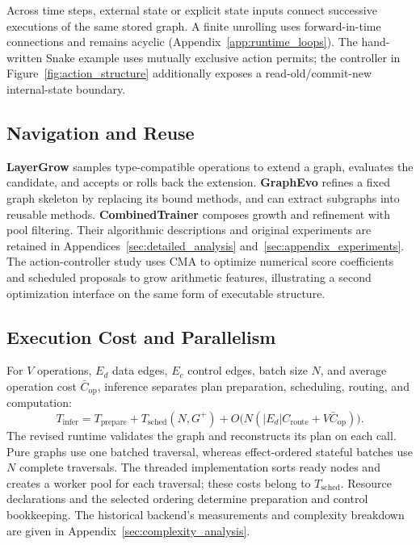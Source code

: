 Across time steps, external state or explicit state inputs connect successive executions of the same stored graph. A finite unrolling uses forward-in-time connections and remains acyclic (Appendix~\ref{app:runtime_loops}). The hand-written Snake example uses mutually exclusive action permits; the controller in Figure~\ref{fig:action_structure} additionally exposes a read-old/commit-new internal-state boundary.

\subsection{Navigation and Reuse}
\label{subsec:navigability_validation}
\textbf{LayerGrow} samples type-compatible operations to extend a graph, evaluates the candidate, and accepts or rolls back the extension. \textbf{GraphEvo} refines a fixed graph skeleton by replacing its bound methods, and can extract subgraphs into reusable methods. \textbf{CombinedTrainer} composes growth and refinement with pool filtering. Their algorithmic descriptions and original experiments are retained in Appendices~\ref{sec:detailed_analysis} and~\ref{sec:appendix_experiments}. The action-controller study uses CMA to optimize numerical score coefficients and scheduled proposals to grow arithmetic features, illustrating a second optimization interface on the same form of executable structure.

\subsection{Execution Cost and Parallelism}
\label{subsec:inference_complexity}
For $V$ operations, $E_d$ data edges, $E_c$ control edges, batch size $N$, and average operation cost $\bar C_{\mathrm{op}}$, inference separates plan preparation, scheduling, routing, and computation:
\begin{equation}
T_{\mathrm{infer}}=T_{\mathrm{prepare}}+T_{\mathrm{sched}}(N,G^+)
+O\bigl(N(|E_d|C_{\mathrm{route}}+V\bar C_{\mathrm{op}})\bigr).
\end{equation}
The revised runtime validates the graph and reconstructs its plan on each call. Pure graphs use one batched traversal, whereas effect-ordered stateful batches use $N$ complete traversals. The threaded implementation sorts ready nodes and creates a worker pool for each traversal; these costs belong to $T_{\mathrm{sched}}$. Resource declarations and the selected ordering determine preparation and control bookkeeping. The historical backend's measurements and complexity breakdown are given in Appendix~\ref{sec:complexity_analysis}.

